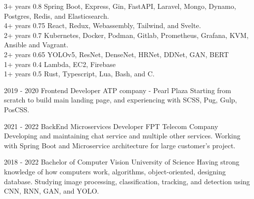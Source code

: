 \documentclass[10pt,A4]{article}
\begin{document}
\begin{paracol}{2}
\begin{leftcolumn}
 {3+ years} {0.8} {Spring Boot, Express, Gin, FastAPI, Laravel, Mongo, Dynamo, Postgres, Redis, and Elasticsearch.} \\[-2pt]

 {4+ years} {0.75} {React, Redux, Webassembly, Tailwind, and Svelte.} \\[-2pt]

 {2+ years} {0.7} {Kubernetes, Docker, Podman, Gitlab, Prometheus, Grafana, KVM, Ansible and Vagrant.} \\[-2pt]

 {2+ years} {0.65} {YOLOv5, ResNet, DenseNet, HRNet, DDNet, GAN, BERT} \\[-2pt]

 {1+ years} {0.4} {Lambda, EC2, Firebase} \\[-2pt]

 {1+ years} {0.5} {Rust, Typescript, Lua, Bash, and C.} \\[-2pt]

\end{leftcolumn}
\begin{rightcolumn}


\cvevent
	{2019 - 2020}
	{Frontend Developer}
	{ATP company - Pearl Plaza}
	{Starting from scratch to build main landing page, and experiencing with SCSS, Pug, Gulp, PosCSS.}
    
\cvevent
    {2021 - 2022}
    {BackEnd Microservices Developer}
    {FPT Telecom Company}
    {Developing and maintaining chat service and multiple other services. Working with Spring Boot and Microservice architecture for large customer's project.}

{}

\cvevent
	{2018 - 2022}
	{Bachelor of Computer Vision}
	{University of Science}
	{Having strong knowledge of how computers work, algorithms, object-oriented, designing database. Studying image processing, classification, tracking, and detection using CNN, RNN, GAN, and YOLO.}


\end{rightcolumn}
\end{paracol}
\end{document}

